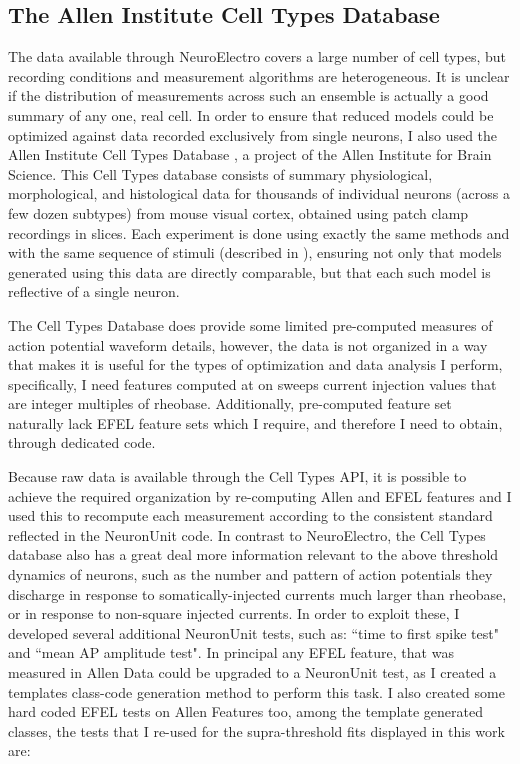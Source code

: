 \subsection{The Allen Institute Cell Types Database}
The data available through NeuroElectro covers a large number of cell types, but recording conditions and measurement algorithms are heterogeneous.
It is unclear if the distribution of measurements across such an ensemble is actually a good summary of any one, real cell.
In order to ensure that reduced models could be optimized against data recorded exclusively from single neurons, I also used the Allen Institute Cell Types Database \citep{celltypes}, a project of the Allen Institute for Brain Science.
This Cell Types database consists of summary physiological, morphological, and histological data for thousands of individual neurons (across a few dozen subtypes) from mouse visual cortex, obtained using patch clamp recordings in slices.
Each experiment is done using exactly the same methods and with the same sequence of stimuli (described in \cite{celltypes}), ensuring not only that models generated using this data are directly comparable, but that each such model is reflective of a single neuron.



The Cell Types Database does provide some limited pre-computed measures of action potential waveform details, however, the data is not organized in a way that makes it is useful for the types of optimization and data analysis I perform,  specifically, I need features computed at on sweeps current injection values that are integer multiples of rheobase. Additionally, pre-computed feature set naturally lack EFEL feature sets which I require, and therefore I need to obtain, through dedicated code.

Because raw data is available through the Cell Types API, it is possible to achieve the required organization by re-computing Allen and EFEL features and I used this to recompute each measurement according to the consistent standard reflected in the NeuronUnit code.
In contrast to NeuroElectro, the Cell Types database also has a great deal more information relevant to the above threshold dynamics of neurons, such as the number and pattern of action potentials they discharge in response to somatically-injected currents much larger than rheobase, or in response to non-square injected currents.
In order to exploit these, I developed several additional NeuronUnit tests, such as: ``time to first spike test" and ``mean AP amplitude test". In principal any EFEL feature, that was measured in Allen Data could be upgraded to a NeuronUnit test, as I created a templates class-code generation method to perform this task. I also created some hard coded EFEL tests on Allen Features too, among the template generated classes, the tests that I re-used for the supra-threshold fits displayed in this work are:


